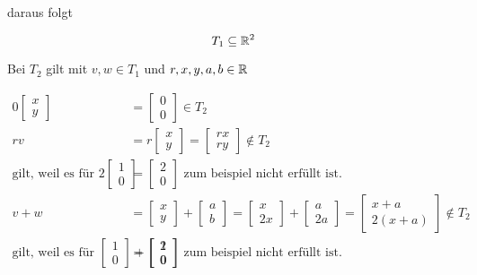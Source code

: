\documentclass[a4paper, 11pt]{article}
\begin{document}
daraus folgt

$$ T_1 \subseteq \mathbb{R}^2 $$

\pagebreak

Bei \(T_2\) gilt mit \(v, w \in T_1\) und \(r, x, y, a, b \in \mathbb{R}\)

\begin{align*}
    0 \begin{bmatrix} x \\ y \end{bmatrix} &= \begin{bmatrix} 0 \\ 0 \end{bmatrix} \in T_2 \\
    r v &= r \begin{bmatrix} x \\ y \end{bmatrix} = \begin{bmatrix} rx \\ ry \end{bmatrix} \not\in T_2 \\
    \text{gilt, weil es für } 2 \begin{bmatrix} 1 \\ 0 \end{bmatrix} &= \begin{bmatrix} 2 \\ 0 \end{bmatrix} \text{ zum beispiel nicht erfüllt ist. } \\
    v + w &= \begin{bmatrix} x \\ y \end{bmatrix} + \begin{bmatrix} a \\ b \end{bmatrix}
    = \begin{bmatrix} x \\ 2x \end{bmatrix} + \begin{bmatrix} a \\ 2a \end{bmatrix}
    = \begin{bmatrix} x + a \\ 2(x + a) \end{bmatrix} \not\in T_2 \\
    \text{gilt, weil es für } \begin{bmatrix} 1 \\ 0 \end{bmatrix} + \begin{bmatrix} 1 \\ 0 \end{bmatrix}
    &= \begin{bmatrix} 2 \\ 0 \end{bmatrix} \text{ zum beispiel nicht erfüllt ist. }
\end{align*}
\end{document}
